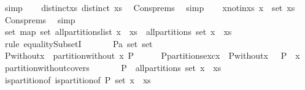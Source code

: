 \begin{isabellebody}
\ simp\isanewline
\isanewline
\ \ \isamarkupfalse%
\ distinct{\isacharunderscore}xs{\isacharcolon}\ {\isachardoublequoteopen}distinct\ xs{\isachardoublequoteclose}\ \isamarkupfalse%
\ Cons{\isachardot}prems\ \isamarkupfalse%
\ simp\isanewline
\ \ \isamarkupfalse%
\ x{\isacharunderscore}notin{\isacharunderscore}xs{\isacharcolon}\ {\isachardoublequoteopen}x\ {\isasymnotin}\ set\ xs{\isachardoublequoteclose}\ \isamarkupfalse%
\ Cons{\isachardot}prems\ \isamarkupfalse%
\ simp\isanewline
\ \ \isanewline
\ \ \isamarkupfalse%
\ {\isachardoublequoteopen}set\ {\isacharparenleft}map\ set\ {\isacharparenleft}all{\isacharunderscore}partitions{\isacharunderscore}list\ {\isacharparenleft}x\ {\isacharhash}\ xs{\isacharparenright}{\isacharparenright}{\isacharparenright}\ {\isacharequal}\ all{\isacharunderscore}partitions\ {\isacharparenleft}set\ {\isacharparenleft}x\ {\isacharhash}\ xs{\isacharparenright}{\isacharparenright}{\isachardoublequoteclose}\isanewline
\ \ \isamarkupfalse%
\ {\isacharparenleft}rule\ equalitySubsetI{\isacharparenright}\ \isanewline
\ \ \ \ \isamarkupfalse%
\ P{\isacharcolon}{\isacharcolon}{\isachardoublequoteopen}{\isacharprime}a\ set\ set{\isachardoublequoteclose}\ \isanewline
\ \ \ \ \isamarkupfalse%
\ {\isacharquery}P{\isacharunderscore}without{\isacharunderscore}x\ {\isacharequal}\ {\isachardoublequoteopen}partition{\isacharunderscore}without\ x\ P{\isachardoublequoteclose}\isanewline
\ \ \ \ \isamarkupfalse%
\ P{\isacharunderscore}partitions{\isacharunderscore}exc{\isacharunderscore}x{\isacharcolon}\ {\isachardoublequoteopen}{\isasymUnion}\ {\isacharquery}P{\isacharunderscore}without{\isacharunderscore}x\ {\isacharequal}\ {\isasymUnion}\ P\ {\isacharminus}\ {\isacharbraceleft}x{\isacharbraceright}{\isachardoublequoteclose}\ \isamarkupfalse%
\ partition{\isacharunderscore}without{\isacharunderscore}covers\ \isacommand{{\isachardot}}\isamarkupfalse%
\isanewline
\isanewline
\ \ \ \ \isamarkupfalse%
\ {\isachardoublequoteopen}P\ {\isasymin}\ all{\isacharunderscore}partitions\ {\isacharparenleft}set\ {\isacharparenleft}x\ {\isacharhash}\ xs{\isacharparenright}{\isacharparenright}{\isachardoublequoteclose}\isanewline
\ \ \ \ \isamarkupfalse%
\ \isamarkupfalse%
\ is{\isacharunderscore}partition{\isacharunderscore}of{\isacharcolon}\ {\isachardoublequoteopen}is{\isacharunderscore}partition{\isacharunderscore}of\ P\ {\isacharparenleft}set\ {\isacharparenleft}x\ {\isacharhash}\ xs{\isacharparenright}{\isacharparenright}{\isachardoublequoteclose}\ \isamarkupfalse%

\end{isabellebody}
